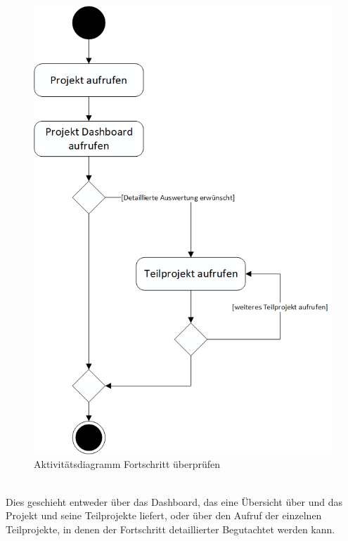 \begin{figure}[h!]
    \centering
    \includegraphics[scale=0.67]{./Bilder/AD6_FortschrittÜberprüfen.png}
    \caption[Aktivitätsdiagramm Anwendungsfall 6]{Aktivitätsdiagramm Fortschritt überprüfen}
    \label{fig:AD6}
\end{figure}
\\Dies geschieht entweder über das Dashboard, das eine Übersicht über und das Projekt und seine Teilprojekte liefert, oder über den Aufruf der einzelnen Teilprojekte, in denen der Fortschritt detaillierter Begutachtet werden kann.
\newpage
